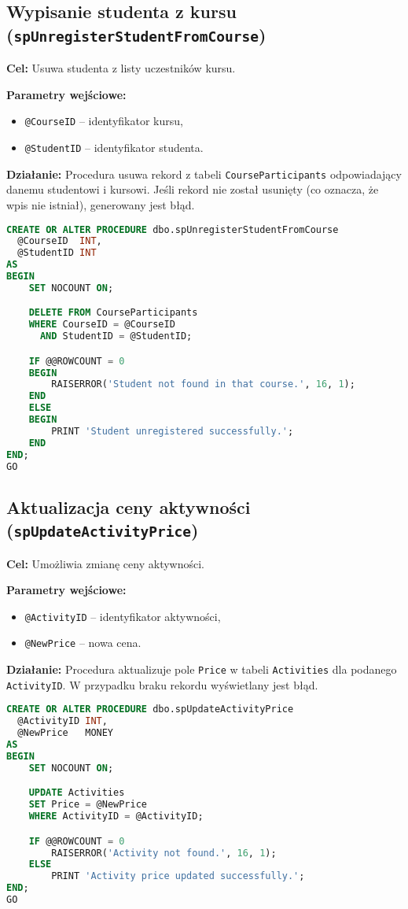 \documentclass[12pt]{article}
\begin{document}
\subsection{Wypisanie studenta z kursu (\texttt{spUnregisterStudentFromCourse})}
\textbf{Cel:} Usuwa studenta z listy uczestników kursu.

\textbf{Parametry wejściowe:}
\begin{itemize}
  \item \texttt{@CourseID} – identyfikator kursu,
  \item \texttt{@StudentID} – identyfikator studenta.
\end{itemize}

\textbf{Działanie:} Procedura usuwa rekord z tabeli \verb|CourseParticipants| odpowiadający danemu studentowi i kursowi. Jeśli rekord nie został usunięty (co oznacza, że wpis nie istniał), generowany jest błąd.

\begin{lstlisting}[language=SQL]
CREATE OR ALTER PROCEDURE dbo.spUnregisterStudentFromCourse
  @CourseID  INT,
  @StudentID INT
AS
BEGIN
    SET NOCOUNT ON;

    DELETE FROM CourseParticipants
    WHERE CourseID = @CourseID
      AND StudentID = @StudentID;

    IF @@ROWCOUNT = 0
    BEGIN
        RAISERROR('Student not found in that course.', 16, 1);
    END
    ELSE
    BEGIN
        PRINT 'Student unregistered successfully.';
    END
END;
GO
\end{lstlisting}

\newpage
\subsection{Aktualizacja ceny aktywności (\texttt{spUpdateActivityPrice})}
\textbf{Cel:} Umożliwia zmianę ceny aktywności.

\textbf{Parametry wejściowe:}
\begin{itemize}
  \item \texttt{@ActivityID} – identyfikator aktywności,
  \item \texttt{@NewPrice} – nowa cena.
\end{itemize}

\textbf{Działanie:} Procedura aktualizuje pole \verb|Price| w tabeli \verb|Activities| dla podanego \verb|ActivityID|. W przypadku braku rekordu wyświetlany jest błąd.

\begin{lstlisting}[language=SQL]
CREATE OR ALTER PROCEDURE dbo.spUpdateActivityPrice
  @ActivityID INT,
  @NewPrice   MONEY
AS
BEGIN
    SET NOCOUNT ON;

    UPDATE Activities
    SET Price = @NewPrice
    WHERE ActivityID = @ActivityID;

    IF @@ROWCOUNT = 0
        RAISERROR('Activity not found.', 16, 1);
    ELSE
        PRINT 'Activity price updated successfully.';
END;
GO
\end{lstlisting}
\end{document}
